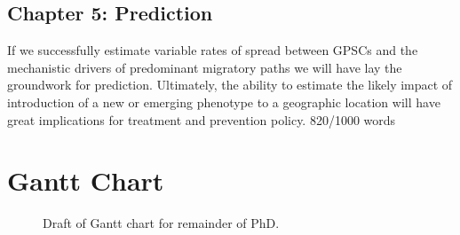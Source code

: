\documentclass{article}
\begin{document}
\subsection{Chapter 5: Prediction}
If we successfully estimate variable rates of spread between GPSCs and the mechanistic drivers of predominant migratory paths we will have lay the groundwork for prediction. Ultimately, the ability to estimate the likely impact of introduction of a new or emerging phenotype to a geographic location will have great implications for treatment and prevention policy. 
820/1000 words
\section{Gantt Chart}
\begin{figure}
\centering
    \caption{Draft of Gantt chart for remainder of PhD.}
      \label{fig:gantt}
\end{figure}
\printbibliography
\end{document}
